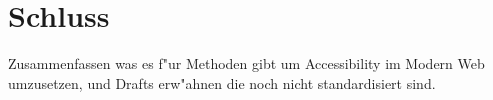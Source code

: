 \documentclass[a4paper,bibtotoc,oneside]{scrbook}
\begin{document}
\chapter{Schluss}
Zusammenfassen was es f"ur Methoden gibt um Accessibility im Modern Web umzusetzen, und Drafts erw"ahnen die noch nicht standardisiert sind.









\end{document}
